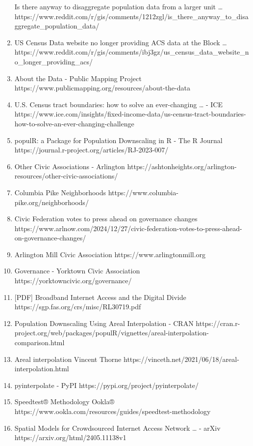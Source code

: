 \documentclass[
  letterpaper,
  DIV=11,
  numbers=noendperiod]{scrartcl}
\begin{document}
\begin{enumerate}
  Is there anyway to disaggregate population data from a larger unit
  \ldots{}
  https://www.reddit.com/r/gis/comments/1212zgl/is\_there\_anyway\_to\_disaggregate\_population\_data/
\item
  US Census Data website no longer providing ACS data at the Block
  \ldots{}
  https://www.reddit.com/r/gis/comments/ibj3gz/us\_census\_data\_website\_no\_longer\_providing\_acs/
\item
  About the Data - Public Mapping Project
  https://www.publicmapping.org/resources/about-the-data
\item
  U.S. Census tract boundaries: how to solve an ever-changing \ldots{} -
  ICE
  https://www.ice.com/insights/fixed-income-data/us-census-tract-boundaries-how-to-solve-an-ever-changing-challenge
\item
  populR: a Package for Population Downscaling in R - The R Journal
  https://journal.r-project.org/articles/RJ-2023-007/
\item
  Other Civic Associations - Arlington
  https://ashtonheights.org/arlington-resources/other-civic-associations/
\item
  Columbia Pike Neighborhoods
  https://www.columbia-pike.org/neighborhoods/
\item
  Civic Federation votes to press ahead on governance changes
  https://www.arlnow.com/2024/12/27/civic-federation-votes-to-press-ahead-on-governance-changes/
\item
  Arlington Mill Civic Association https://www.arlingtonmill.org
\item
  Governance - Yorktown Civic Association
  https://yorktowncivic.org/governance/
\item
  {[}PDF{]} Broadband Internet Access and the Digital Divide
  https://sgp.fas.org/crs/misc/RL30719.pdf
\item
  Population Downscaling Using Areal Interpolation - CRAN
  https://cran.r-project.org/web/packages/populR/vignettes/areal-interpolation-comparison.html
\item
  Areal interpolation \textbar{} Vincent Thorne
  https://vinceth.net/2021/06/18/areal-interpolation.html
\item
  pyinterpolate - PyPI https://pypi.org/project/pyinterpolate/
\item
  Speedtest® Methodology \textbar{} Ookla®
  https://www.ookla.com/resources/guides/speedtest-methodology
\item
  Spatial Models for Crowdsourced Internet Access Network \ldots{} -
  arXiv https://arxiv.org/html/2405.11138v1

\end{enumerate}
\end{document}
